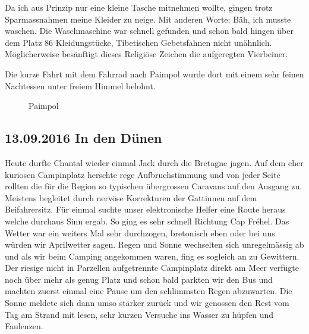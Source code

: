 Da ich aus Prinzip nur eine kleine Tasche mitnehmen wollte, gingen trotz Sparmassnahmen meine Kleider zu neige.
Mit anderen Worte; Bäh, ich musste waschen.
Die Waschmaschine war schnell gefunden und schon bald hingen über dem Platz 86 Kleidungstücke, Tibetischen Gebetsfahnen nicht unähnlich.
Möglicherweise besänftigt dieses Religiöse Zeichen die aufgeregten Vierbeiner.

Die kurze Fahrt mit dem Fahrrad nach Paimpol wurde dort mit einem sehr feinen Nachtessen unter freiem Himmel belohnt.

\begin{figure}[H]
   \centering
   \quad
   \quad
   \quad
   \caption[Paimpol]{Paimpol}
\end{figure}

\subsection{13.09.2016 In den Dünen}
Heute \glqq durfte\grqq{} Chantal wieder einmal Jack durch die Bretagne jagen.
Auf dem eher kuriosen Campinplatz herschte rege Aufbruchstimmung und von jeder Seite rollten die für die Region so typischen übergrossen Caravans auf den Ausgang zu.
Meistens begleitet durch nervöse Korrekturen der Gattinnen auf dem Beifahrersitz.
Für einmal suchte unser elektronische Helfer eine Route heraus welche durchaus Sinn ergab.
So ging es sehr schnell Richtung Cap Fréhel.
Das Wetter war ein weiters Mal sehr durchzogen, bretonisch eben oder bei uns würden wir Aprilwetter sagen.
Regen und Sonne wechselten sich unregelmässig ab und als wir beim Camping angekommen waren, fing es sogleich an zu Gewittern.
Der riesige nicht in Parzellen aufgetrennte Campinplatz direkt am Meer verfügte noch über mehr als genug Platz und schon bald parkten wir den Bus und machten zuerst einmal eine Pause um den schlimmsten Regen abzuwarten.
Die Sonne meldete sich dann umso stärker zurück und wir genossen den Rest vom Tag am Strand mit lesen, sehr kurzen Versuche ins Wasser zu hüpfen und Faulenzen.

